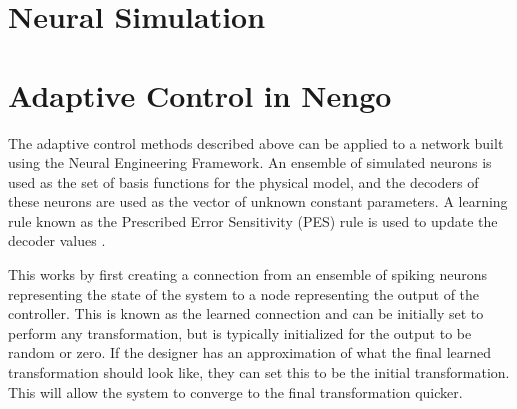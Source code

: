 \documentclass[letterpaper,12pt,titlepage,oneside,final]{book}
\begin{document}
\section{Neural Simulation}

\cite{bekolay2013nengo}




\section{Adaptive Control in Nengo}


The adaptive control methods described above can be applied to a network built using the Neural Engineering Framework. 
An ensemble of simulated neurons is used as the set of basis functions for the physical model, and the decoders of these neurons are used as the vector of unknown constant parameters. 
A learning rule known as the Prescribed Error Sensitivity (PES) rule is used to update the decoder values \cite{bekolay2013simultaneous}. 

This works by first creating a connection from an ensemble of spiking neurons representing the state of the system to a node representing the output of the controller. 
This is known as the learned connection and can be initially set to perform any transformation, but is typically initialized for the output to be random or zero. 
If the designer has an approximation of what the final learned transformation should look like, they can set this to be the initial transformation. 
This will allow the system to converge to the final transformation quicker.
\end{document}
